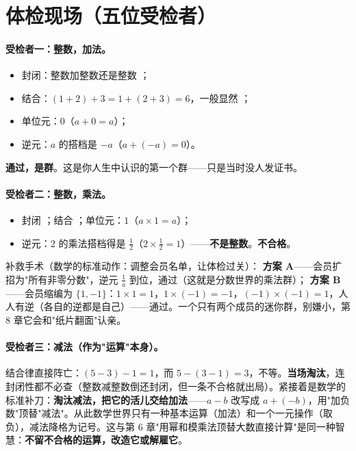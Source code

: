 \section{体检现场（五位受检者）}

\paragraph{受检者一：整数，加法。}
\begin{itemize}
\item 封闭：整数加整数还是整数 \checkmark；
\item 结合：$(1+2)+3 = 1+(2+3) = 6$，一般显然 \checkmark；
\item 单位元：$0$（$a + 0 = a$）\checkmark；
\item 逆元：$a$ 的搭档是 $-a$（$a + (-a) = 0$）\checkmark。
\end{itemize}
\textbf{通过，是群}。这是你人生中认识的第一个群——只是当时没人发证书。

\paragraph{受检者二：整数，乘法。}
\begin{itemize}
\item 封闭 \checkmark；结合 \checkmark；单位元：$1$（$a\times1 = a$）\checkmark；
\item 逆元：$2$ 的乘法搭档得是 $\tfrac12$（$2\times\tfrac12 = 1$）——\textbf{不是整数}。\textbf{不合格}。
\end{itemize}
补救手术（数学的标准动作：调整会员名单，让体检过关）：
\textbf{方案 A}——会员扩招为"所有非零分数"，逆元 $\tfrac1a$ 到位，通过（这就是分数世界的乘法群）；
\textbf{方案 B}——会员缩编为 $\{1, -1\}$：$1\times1=1$，$1\times(-1) = -1$，$(-1)\times(-1)=1$，人人有逆（各自的逆都是自己）——通过。一个只有两个成员的迷你群，别嫌小，第 8 章它会和"纸片翻面"认亲。

\paragraph{受检者三：减法（作为"运算"本身）。}
结合律直接阵亡：$(5-3)-1 = 1$，而 $5-(3-1) = 3$，不等。\textbf{当场淘汰}，连封闭性都不必查（整数减整数倒还封闭，但一条不合格就出局）。紧接着是数学的标准补刀：\textbf{淘汰减法，把它的活儿交给加法}——$a - b$ 改写成 $a + (-b)$，用"加负数"顶替"减法"。从此数学世界只有一种基本运算（加法）和一个一元操作（取负），减法降格为记号。这与第 6 章"用幂和模乘法顶替大数直接计算"是同一种智慧：\textbf{不留不合格的运算，改造它或解雇它}。

